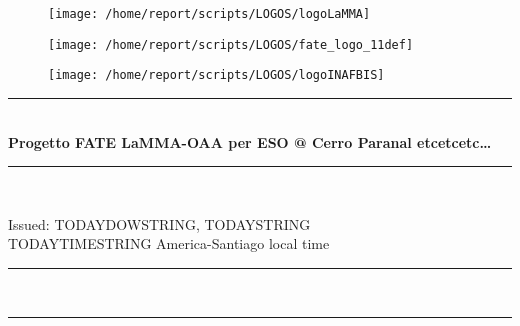 \documentclass[11pt,english]{article}
\newcommand{\HRule}{\rule{\linewidth}{0.5mm}}
\begin{document}
\begin{figure}
\begin{center}
\hspace{1.5cm}
\parbox{5.5cm}{\texttt{[image: /home/report/scripts/LOGOS/logoLaMMA]}}
\hspace{.3cm}
\parbox{5.5cm}{\texttt{[image: /home/report/scripts/LOGOS/fate\_logo\_11def]}}
\hspace{.3cm}
\parbox{5.5cm}{\texttt{[image: /home/report/scripts/LOGOS/logoINAFBIS]}}
\hspace{.1cm}
\vspace{1.2cm}
\end{center}
\end{figure}

\begin{center}
\HRule \\[0.4cm]
\Huge{\textbf{Progetto FATE LaMMA-OAA per ESO @ Cerro Paranal etcetcetc\ldots}}
\HRule \\[0.4cm]
\end{center}

\begin{center}
\vspace{2cm}\Huge{Issued: TODAYDOWSTRING, TODAYSTRING\\ TODAYTIMESTRING America-Santiago local time}
\end{center}

\begin{center}
\HRule \\[0.1cm]
\tableofcontents
\HRule \\[0.1cm]
\end{center}
\newpage
\end{document}
